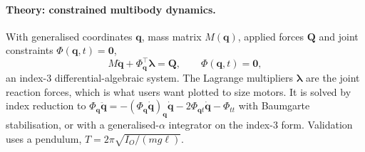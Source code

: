 \paragraph{Theory: constrained multibody dynamics.} With generalised coordinates $\mathbf q$, mass
matrix $M(\mathbf q)$, applied forces $\mathbf Q$ and joint constraints $\Phi(\mathbf q,t)=\mathbf 0$,
\[
  M\ddot{\mathbf q}+\Phi_{\mathbf q}^{\!\top}\boldsymbol\lambda=\mathbf Q,\qquad \Phi(\mathbf q,t)=\mathbf 0,
\]
an index-3 differential-algebraic system. The Lagrange multipliers $\boldsymbol\lambda$ are the joint reaction
forces, which is what users want plotted to size motors. It is solved by index reduction to
$\Phi_{\mathbf q}\ddot{\mathbf q}=-(\Phi_{\mathbf q}\dot{\mathbf q})_{\mathbf q}\dot{\mathbf q}-2\Phi_{\mathbf qt}\dot{\mathbf q}-\Phi_{tt}$
with Baumgarte stabilisation, or with a generalised-$\alpha$ integrator on the index-3 form. Validation uses a
pendulum, $T=2\pi\sqrt{I_O/(m g\ell)}$.
